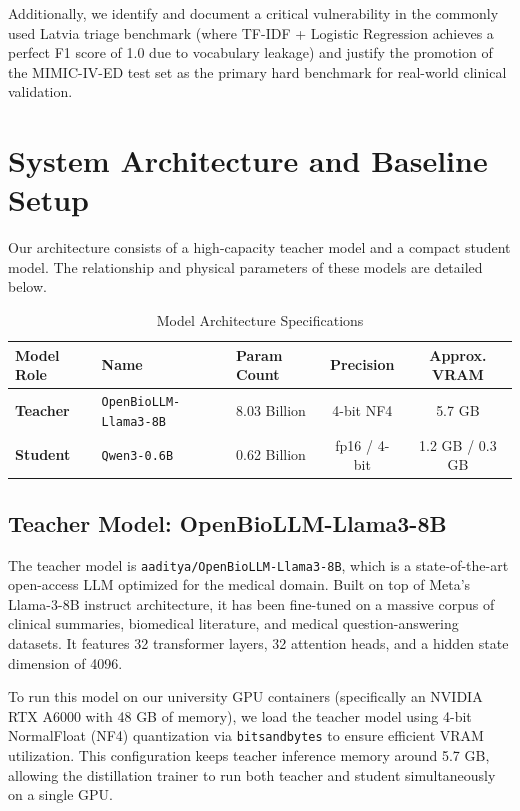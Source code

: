 \documentclass[a4paper, 12pt]{article}
\begin{document}
Additionally, we identify and document a critical vulnerability in the commonly used Latvia triage benchmark (where TF-IDF + Logistic Regression achieves a perfect F1 score of 1.0 due to vocabulary leakage) and justify the promotion of the MIMIC-IV-ED test set as the primary hard benchmark for real-world clinical validation.

\section{System Architecture and Baseline Setup}
\label{sec:architecture}

Our architecture consists of a high-capacity teacher model and a compact student model. The relationship and physical parameters of these models are detailed below.

\begin{table}[h]
\centering
\caption{Model Architecture Specifications}
\label{tab:architectures}
\begin{tabular}{lllcc}
\toprule
Model Role & Name & Param Count & Precision & Approx. VRAM \\
\midrule
\textbf{Teacher} & \texttt{OpenBioLLM-Llama3-8B} & 8.03 Billion & 4-bit NF4 & 5.7 GB \\
\textbf{Student} & \texttt{Qwen3-0.6B} & 0.62 Billion & fp16 / 4-bit & 1.2 GB / 0.3 GB \\
\bottomrule
\end{tabular}
\end{table}

\subsection{Teacher Model: OpenBioLLM-Llama3-8B}
The teacher model is \texttt{aaditya/OpenBioLLM-Llama3-8B}, which is a state-of-the-art open-access LLM optimized for the medical domain. Built on top of Meta's Llama-3-8B instruct architecture, it has been fine-tuned on a massive corpus of clinical summaries, biomedical literature, and medical question-answering datasets. It features 32 transformer layers, 32 attention heads, and a hidden state dimension of 4096. 

To run this model on our university GPU containers (specifically an NVIDIA RTX A6000 with 48 GB of memory), we load the teacher model using 4-bit NormalFloat (NF4) quantization via \texttt{bitsandbytes} to ensure efficient VRAM utilization. This configuration keeps teacher inference memory around 5.7 GB, allowing the distillation trainer to run both teacher and student simultaneously on a single GPU.
\end{document}
